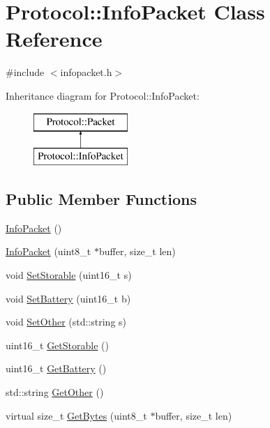 \hypertarget{class_protocol_1_1_info_packet}{}\section{Protocol\+:\+:Info\+Packet Class Reference}
\label{class_protocol_1_1_info_packet}


{\ttfamily \#include $<$infopacket.\+h$>$}

Inheritance diagram for Protocol\+:\+:Info\+Packet\+:\begin{figure}[H]
\begin{center}
\leavevmode
\includegraphics[height=2.000000cm]{class_protocol_1_1_info_packet}
\end{center}
\end{figure}
\subsection*{Public Member Functions}
\begin{DoxyCompactItemize}
\item 
\hyperlink{class_protocol_1_1_info_packet_a11fa7cf70f73872adb44ba550bfe3bad}{Info\+Packet} ()
\item 
\hyperlink{class_protocol_1_1_info_packet_a3492d10770f6fbbeda7b49be359fcf7c}{Info\+Packet} (uint8\+\_\+t $\ast$buffer, size\+\_\+t len)
\item 
void \hyperlink{class_protocol_1_1_info_packet_aa41807efe3d80764352e2cabe0ce3dab}{Set\+Storable} (uint16\+\_\+t s)
\item 
void \hyperlink{class_protocol_1_1_info_packet_a9d892385a9ec50b38411af3fb9f07d81}{Set\+Battery} (uint16\+\_\+t b)
\item 
void \hyperlink{class_protocol_1_1_info_packet_a1751ad384a82367591e851bfa479fda2}{Set\+Other} (std\+::string s)
\item 
uint16\+\_\+t \hyperlink{class_protocol_1_1_info_packet_a83e236806b6ae78ae7486c6b12e9f94f}{Get\+Storable} ()
\item 
uint16\+\_\+t \hyperlink{class_protocol_1_1_info_packet_a2bb88fcedd69d0bb22db500de6ff11f7}{Get\+Battery} ()
\item 
std\+::string \hyperlink{class_protocol_1_1_info_packet_a4cfc3b5c49b57016e7b4f72f74b62021}{Get\+Other} ()
\item 
virtual size\+\_\+t \hyperlink{class_protocol_1_1_info_packet_ad1f43721045348442cf224533bce7f1a}{Get\+Bytes} (uint8\+\_\+t $\ast$buffer, size\+\_\+t len)
\end{DoxyCompactItemize}
